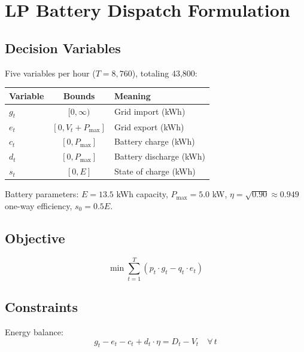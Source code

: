 \documentclass[9pt]{article}
\begin{document}
\section{LP Battery Dispatch Formulation}
\label{sec:lp}

\subsection{Decision Variables}

Five variables per hour ($T = 8{,}760$), totaling 43,800:

\begin{table}[htbp]
\centering
\begin{tabular}{l c l}
\toprule
\textbf{Variable} & \textbf{Bounds} & \textbf{Meaning} \\
\midrule
$g_t$ & $[0, \infty)$ & Grid import (kWh) \\
$e_t$ & $[0, V_t + P_{\max}]$ & Grid export (kWh) \\
$c_t$ & $[0, P_{\max}]$ & Battery charge (kWh) \\
$d_t$ & $[0, P_{\max}]$ & Battery discharge (kWh) \\
$s_t$ & $[0, E]$ & State of charge (kWh) \\
\bottomrule
\end{tabular}
\end{table}

Battery parameters: $E = 13.5$ kWh capacity, $P_{\max} = 5.0$ kW, $\eta = \sqrt{0.90} \approx 0.949$ one-way efficiency, $s_0 = 0.5 E$.

\subsection{Objective}

\begin{equation}
\min \sum_{t=1}^{T} \left( p_t \cdot g_t - q_t \cdot e_t \right)
\end{equation}

\subsection{Constraints}

Energy balance:
\begin{equation}
g_t - e_t - c_t + d_t \cdot \eta = D_t - V_t \quad \forall \, t
\end{equation}
\end{document}
